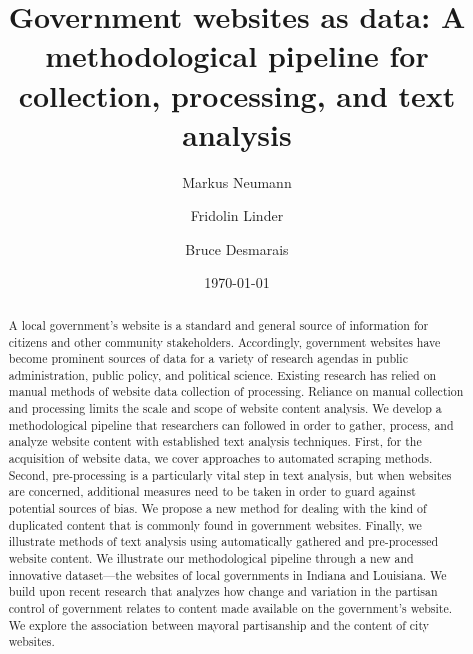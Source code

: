 \documentclass[11pt]{article}
\title{\vspace{-2cm} Government websites as data: A methodological pipeline for collection, processing, and text analysis }
\author{ Markus Neumann \and Fridolin Linder \and Bruce Desmarais} \date{\today}
\begin{document}
\maketitle




\begin{abstract}

A local government's website is a standard and general source of information for citizens and other community stakeholders. Accordingly, government websites have become prominent sources of data for a variety of research agendas in public administration, public policy, and political science. Existing research has relied on manual methods of website data collection of processing. Reliance on manual collection and processing limits the scale and scope of website content analysis.  We develop a methodological pipeline that researchers can followed in order to gather, process, and analyze website content with established text analysis techniques. First, for the acquisition of website data, we cover approaches to automated scraping methods. Second, pre-processing is a particularly vital step in text analysis, but when websites are concerned, additional measures need to be taken in order to guard against potential sources of bias. We propose a new method for dealing with the kind of duplicated content that is commonly found in government websites. Finally, we illustrate methods of text analysis using automatically gathered and pre-processed website content. We illustrate our methodological pipeline through a new and innovative dataset---the websites of local governments in Indiana and Louisiana. We build upon recent research that analyzes how change and variation in the partisan control of government relates to content made available on the government's website. We explore the association between mayoral partisanship and the content of city websites.

\end{abstract}
\thispagestyle{empty}
\end{document}
